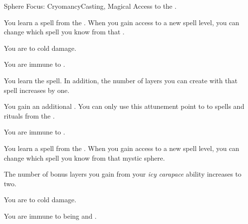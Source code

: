     \begin{feat}{Sphere Focus: Cryomancy}{Casting, Magical}
        \featpre Access to the  .

         You learn a spell from the  .
        When you gain access to a new spell level, you can change which spell you know from that .

         You are  to cold damage.

         You are immune to .

         You learn the  spell.
        In addition, the number of layers you can create with that spell increases by one.

         You gain an additional .
        You can only use this attunement point to  to spells and rituals from the  .

         You are immune to .

         You learn a spell from the  .
        When you gain access to a new spell level, you can change which spell you know from that mystic sphere.

         The number of bonus layers you gain from your \textit{icy carapace} ability increases to two.

         You are  to cold damage.

         You are immune to being \slowed and \immobilized.
    \end{feat}

